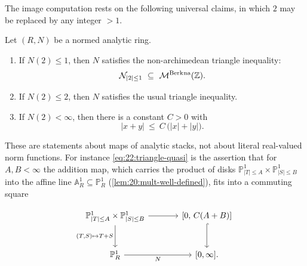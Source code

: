 The image computation rests on the following universal claims, in which
$2$ may be replaced by any integer $>1$.

\begin{proposition}
\label{prop:22:triangle}
Let $(R,N)$ be a normed analytic ring.
\begin{enumerate}
\item If $N(2)\le1$, then $N$ satisfies the non-archimedean triangle inequality:
\begin{equation}
\label{eq:22:triangle-na}
\mathcal N_{|2|\le1}\ \subseteq\ \mathcal{M}^{\mathrm{Berk}}{}^{\mathrm{na}}(\mathbb Z).
\end{equation}
\item If $N(2)\le2$, then $N$ satisfies the usual triangle inequality.
\item If $N(2)<\infty$, then there is a constant $C>0$ with
\begin{equation}
\label{eq:22:triangle-quasi}
|x+y|\ \le\ C\,\bigl(|x|+|y|\bigr).
\end{equation}
\end{enumerate}
\end{proposition}

These are statements about maps of analytic stacks, not about literal
real-valued norm functions. For instance \eqref{eq:22:triangle-quasi} is the
assertion that for $A,B<\infty$ the addition map, which carries the product of
disks $\mathbb P^1_{|T|\le A}\times\mathbb P^1_{|S|\le B}$ into the affine line
$\mathbb A^1_R\subseteq\mathbb P^1_R$ (\cref{lem:20:mult-well-defined}), fits
into a commuting square

\begin{equation*}
\begin{tikzcd}[column sep=large, row sep=large]
\mathbb P^1_{|T|\le A}\times\mathbb P^1_{|S|\le B}
  \arrow[r] \arrow[d, "{(T,S)\mapsto T+S}"']
& {[0,\,C(A+B)]} \arrow[d, hook] \\
\mathbb P^1_R \arrow[r, "N"'] & {[0,\infty] .}
\end{tikzcd}
\end{equation*}

